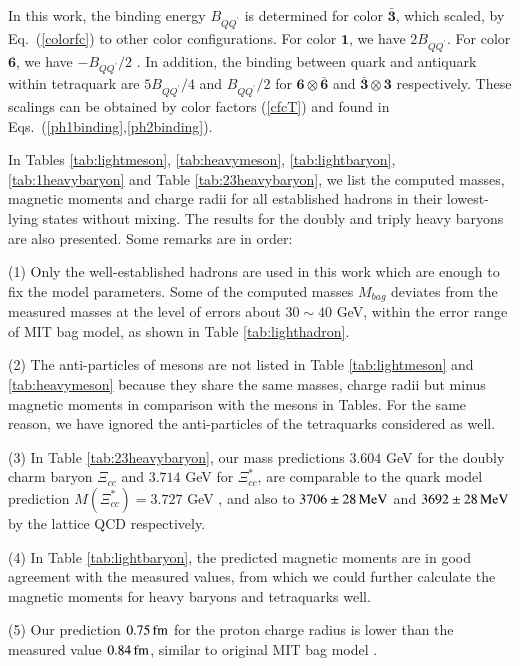 \documentclass[prd,twocolumn,floatfix,nofootinbib]{revtex4}
\begin{document}
In this work, the binding energy $B_{QQ^{\prime}}$ is determined for color $\boldsymbol{\bar{3}}$, which scaled, by Eq.~(\ref{colorfc}) to other color configurations. 
For color $\boldsymbol{1}$, we have $2B_{QQ^{\prime}}$. For color $\boldsymbol{6}$, we have $-B_{QQ^{\prime}}/2$ . 
In addition, the binding between quark and antiquark within tetraquark are $5B_{QQ^{\prime}}/4$ and $B_{QQ^{\prime}}/2$ for $\boldsymbol{6}\otimes\boldsymbol{\bar{6}}$ and $\boldsymbol{\bar{3}}\otimes\boldsymbol{3}$ respectively. 
These scalings can be obtained by color factors (\ref{cfcT}) and found in Eqs.~(\ref{ph1binding},\ref{ph2binding}).

In Tables \ref{tab:lightmeson}, \ref{tab:heavymeson}, \ref{tab:lightbaryon}, \ref{tab:1heavybaryon} and Table \ref{tab:23heavybaryon}, we list the computed masses, magnetic moments and charge radii for all established hadrons in their lowest-lying states without mixing. 
The results for the doubly and triply heavy baryons are also presented. Some remarks are in order: 

(1) Only the well-established hadrons are used in this work which are enough to fix the model parameters. 
Some of the computed masses $M_{bag}$ deviates from the measured masses at the level of errors about $30\sim 40$ GeV, within the error range of MIT bag model, as shown in Table \ref{tab:lighthadron}.

(2) The anti-particles of mesons are not listed in Table \ref{tab:lightmeson} and \ref{tab:heavymeson} because they share the same masses, charge radii but minus magnetic moments in comparison with the mesons in Tables. 
For the same reason, we have ignored the anti-particles of the tetraquarks considered as well.

(3) In Table \ref{tab:23heavybaryon}, our mass predictions $3.604$ GeV for the doubly charm baryon $\Xi_{cc}$ and $3.714$ GeV for $\Xi_{cc}^{\ast}$, 
are comparable to the quark model prediction $M\left(\Xi_{cc}^{\ast}\right)=3.727$ GeV \cite{Ebert:2004ck}, and also to $3706\pm 28\,{\rm MeV}$ and $3692\pm 28\,{\rm MeV}$ by the lattice QCD \cite{PACS-CS:2013vie,Brown:2014ena} respectively.

(4) In Table \ref{tab:lightbaryon}, the predicted magnetic moments are in good agreement with the measured values, from which we could further calculate the magnetic moments for heavy baryons and tetraquarks well.

(5) Our prediction $0.75\,{\rm fm}$ for the proton charge radius is lower than the measured value $0.84\,{\rm fm}$, similar to original MIT bag model \cite{Johnson:1975zp,DeGrand:1975cf}. 
\end{document}
